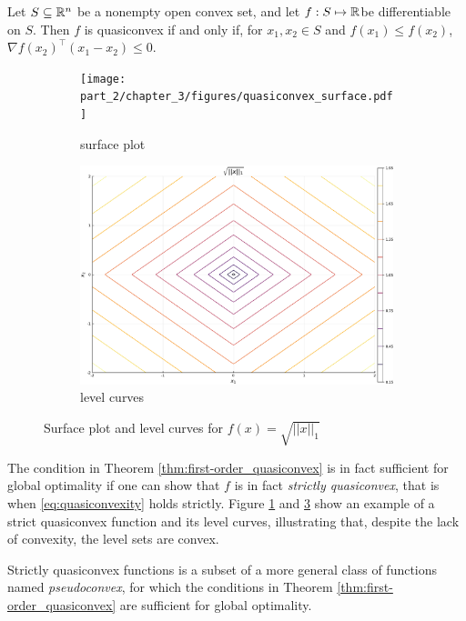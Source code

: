 \begin{theorem}\label{thm:first-order_quasiconvex}
Let $S \subseteq \mathbb{R}^n$ be a nonempty open convex set, and let $f:S \mapsto \mathbb{R}$\lb be differentiable on $S$. Then $f$ is quasiconvex if and only if, for $x_1, x_2 \in S$ and $f(x_1) \leq f(x_2)$, $\nabla f(x_2)^\top(x_1 - x_2) \leq 0$.
\end{theorem}
%
\begin{figure}[h]
	\begin{subfigure}[b]{0.45\textwidth}
		\texttt{[image: part\_2/chapter\_3/figures/quasiconvex\_surface.pdf]}\caption{surface plot}\label{fig:quasiconvex_surface}
	\end{subfigure}
	\begin{subfigure}[b]{0.45\textwidth}
		\includegraphics[width=\textwidth]{part_2/chapter_3/figures/quasiconvex_contours.pdf}
	\caption{level curves}\label{fig:quasiconvex_contours}
	\end{subfigure}
	\caption{Surface plot and level curves for $f(x) = \sqrt{||x||_1}$} 
\end{figure}

The condition in Theorem \ref{thm:first-order_quasiconvex} is in fact sufficient for global optimality if one can show that $f$ is in fact \emph{strictly quasiconvex}, that is when \eqref{eq:quasiconvexity} holds strictly. Figure \ref{fig:quasiconvex_surface} and \ref{fig:quasiconvex_contours} show an example of a strict quasiconvex function and its level curves, illustrating that, despite the lack of convexity, the level sets are convex.

Strictly quasiconvex functions is a subset of a more general class of functions named \emph{pseudoconvex}, for which the conditions in Theorem \ref{thm:first-order_quasiconvex} are sufficient for global optimality. 